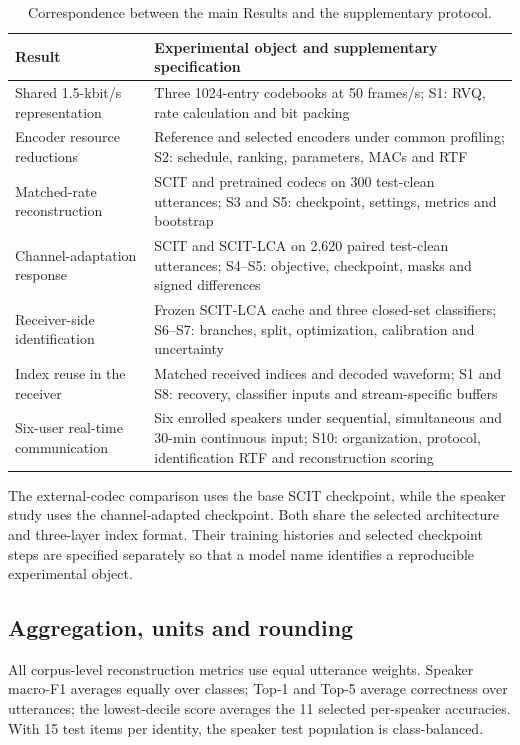 \begin{table}[H]
\centering
\scriptsize
\setlength{\tabcolsep}{3pt}
\renewcommand{\arraystretch}{0.96}
\caption{Correspondence between the main Results and the supplementary protocol.}
\label{tab:sv2-crosswalk}
\begin{tabularx}{\columnwidth}{@{}>{\raggedright\arraybackslash}p{}Y@{}}
\toprule
Result & Experimental object and supplementary specification\\
\midrule
Shared 1.5-kbit/s representation & Three 1024-entry codebooks at 50 frames/s; S1: RVQ, rate calculation and bit packing\\
Encoder resource reductions & Reference and selected encoders under common profiling; S2: schedule, ranking, parameters, MACs and RTF\\
Matched-rate reconstruction & SCIT and pretrained codecs on 300 test-clean utterances; S3 and S5: checkpoint, settings, metrics and bootstrap\\
Channel-adaptation response & SCIT and SCIT-LCA on 2,620 paired test-clean utterances; S4--S5: objective, checkpoint, masks and signed differences\\
Receiver-side identification & Frozen SCIT-LCA cache and three closed-set classifiers; S6--S7: branches, split, optimization, calibration and uncertainty\\
Index reuse in the receiver & Matched received indices and decoded waveform; S1 and S8: recovery, classifier inputs and stream-specific buffers\\
Six-user real-time communication & Six enrolled speakers under sequential, simultaneous and 30-min continuous input; S10: organization, protocol, identification RTF and reconstruction scoring\\
\bottomrule
\end{tabularx}
\end{table}

The external-codec comparison uses the base SCIT checkpoint, while the speaker study uses the channel-adapted checkpoint. Both share the selected architecture and three-layer index format. Their training histories and selected checkpoint steps are specified separately so that a model name identifies a reproducible experimental object.

\subsection{Aggregation, units and rounding}
All corpus-level reconstruction metrics use equal utterance weights. Speaker macro-F1 averages equally over classes; Top-1 and Top-5 average correctness over utterances; the lowest-decile score averages the 11 selected per-speaker accuracies. With 15 test items per identity, the speaker test population is class-balanced.

